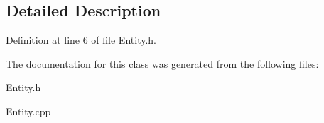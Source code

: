 \subsection{Detailed Description}


Definition at line 6 of file Entity.\+h.



The documentation for this class was generated from the following files\+:\begin{DoxyCompactItemize}
\item 
Entity.\+h\item 
Entity.\+cpp\end{DoxyCompactItemize}

